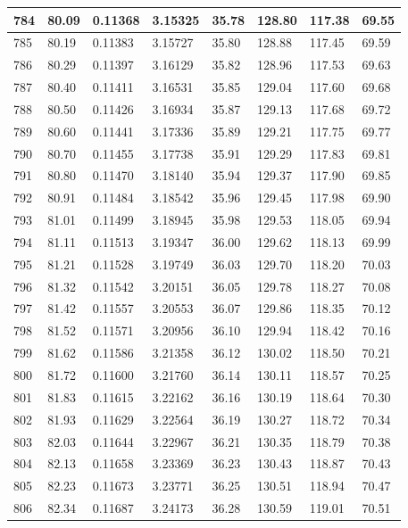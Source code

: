 \documentclass[12pt,a4paper,twoside]{article}
\begin{document}
\begin{center}
\begin{longtable}{l l l l | l l l l}
784 & 80.09 & 0.11368 & 3.15325 & 35.78 & 128.80 & 117.38 & 69.55 \\ \hline
785 & 80.19 & 0.11383 & 3.15727 & 35.80 & 128.88 & 117.45 & 69.59 \\ \hline
786 & 80.29 & 0.11397 & 3.16129 & 35.82 & 128.96 & 117.53 & 69.63 \\ \hline
787 & 80.40 & 0.11411 & 3.16531 & 35.85 & 129.04 & 117.60 & 69.68 \\ \hline
788 & 80.50 & 0.11426 & 3.16934 & 35.87 & 129.13 & 117.68 & 69.72 \\ \hline
789 & 80.60 & 0.11441 & 3.17336 & 35.89 & 129.21 & 117.75 & 69.77 \\ \hline
790 & 80.70 & 0.11455 & 3.17738 & 35.91 & 129.29 & 117.83 & 69.81 \\ \hline
791 & 80.80 & 0.11470 & 3.18140 & 35.94 & 129.37 & 117.90 & 69.85 \\ \hline
792 & 80.91 & 0.11484 & 3.18542 & 35.96 & 129.45 & 117.98 & 69.90 \\ \hline
793 & 81.01 & 0.11499 & 3.18945 & 35.98 & 129.53 & 118.05 & 69.94 \\ \hline
794 & 81.11 & 0.11513 & 3.19347 & 36.00 & 129.62 & 118.13 & 69.99 \\ \hline
795 & 81.21 & 0.11528 & 3.19749 & 36.03 & 129.70 & 118.20 & 70.03 \\ \hline
796 & 81.32 & 0.11542 & 3.20151 & 36.05 & 129.78 & 118.27 & 70.08 \\ \hline
797 & 81.42 & 0.11557 & 3.20553 & 36.07 & 129.86 & 118.35 & 70.12 \\ \hline
798 & 81.52 & 0.11571 & 3.20956 & 36.10 & 129.94 & 118.42 & 70.16 \\ \hline
799 & 81.62 & 0.11586 & 3.21358 & 36.12 & 130.02 & 118.50 & 70.21 \\ \hline
800 & 81.72 & 0.11600 & 3.21760 & 36.14 & 130.11 & 118.57 & 70.25 \\ \hline
801 & 81.83 & 0.11615 & 3.22162 & 36.16 & 130.19 & 118.64 & 70.30 \\ \hline
802 & 81.93 & 0.11629 & 3.22564 & 36.19 & 130.27 & 118.72 & 70.34 \\ \hline
803 & 82.03 & 0.11644 & 3.22967 & 36.21 & 130.35 & 118.79 & 70.38 \\ \hline
804 & 82.13 & 0.11658 & 3.23369 & 36.23 & 130.43 & 118.87 & 70.43 \\ \hline
805 & 82.23 & 0.11673 & 3.23771 & 36.25 & 130.51 & 118.94 & 70.47 \\ \hline
806 & 82.34 & 0.11687 & 3.24173 & 36.28 & 130.59 & 119.01 & 70.51 \\ \hline

\end{longtable}
\end{center}
\end{document}
